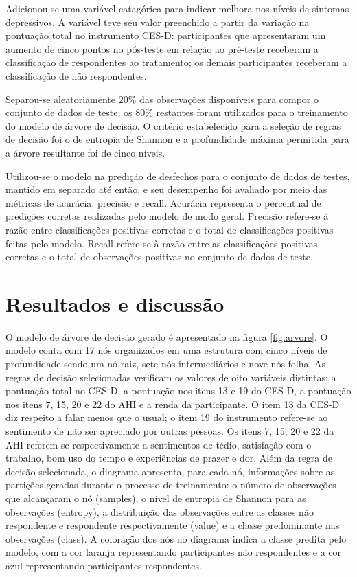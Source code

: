 Adicionou-se uma variável catagórica para indicar melhora nos níveis de sintomas depressivos. A variável teve seu valor preenchido a partir da variação na pontuação total no instrumento CES-D:
participantes que apresentaram um aumento de cinco pontos no pós-teste em relação ao pré-teste receberam a classificação de respondentes ao tratamento; os demais participantes receberam a
classificação de não respondentes.

Separou-se aleatoriamente $20\%$ das observações disponíveis para compor o conjunto de dados de teste; os $80\%$ restantes foram utilizados para o treinamento do modelo de árvore de decisão.
O critério estabelecido para a seleção de regras de decisão foi o de entropia de Shannon \cite{ScikitLearn} e a profundidade máxima permitida para a árvore resultante foi de cinco níveis.

Utilizou-se o modelo na predição de desfechos para o conjunto de dados de testes, mantido em separado até então, e seu desempenho foi avaliado por meio das métricas de acurácia, precisão e
recall. Acurácia representa o percentual de predições corretas realizadas pelo modelo de modo geral. Precisão refere-se à razão entre classificações positivas corretas e o total de classificações
positivas feitas pelo modelo. Recall refere-se à razão entre as classificações positivas corretas e o total de observações positivas no conjunto de dados de teste.

\section{Resultados e discussão}

O modelo de árvore de decisão gerado é apresentado na figura \ref{fig:arvore}. O modelo conta com 17 nós organizados em uma estrutura com cinco níveis de profundidade sendo um nó raiz, sete
nós intermediários e nove nós folha. As regras de decisão selecionadas verificam os valores de oito variáveis distintas: a pontuação total no CES-D, a pontuação nos itens 13 e 19 do CES-D,
a pontuação nos itens 7, 15, 20 e 22 do AHI e a renda da participante. O item 13 da CES-D diz respeito a falar menos que o usual; o item 19 do instrumento refere-se ao sentimento de não ser
apreciado por outras pessoas. Os itens 7, 15, 20 e 22 da AHI referem-se respectivamente a sentimentos de tédio, satisfação com o trabalho, bom uso do tempo e experiências de prazer e dor.
Além da regra de decisão selecionada, o diagrama apresenta, para cada nó, informações sobre as partições geradas durante o processo de treinamento: o número de observações que alcançaram o
nó (samples), o nível de entropia de Shannon para as observações (entropy), a distribuição das observações entre as classes não respondente e respondente respectivamente (value) e a classe
predominante nas observações (class). A coloração dos nós no diagrama indica a classe predita pelo modelo, com a cor laranja representando participantes não respondentes e a cor azul representando
participantes respondentes.

